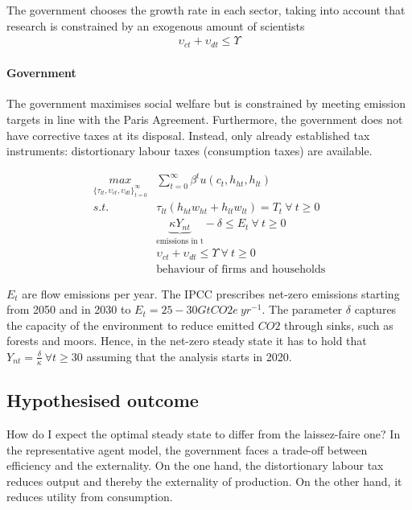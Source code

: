 The government chooses the growth rate in each sector, taking into account that research is constrained by an exogenous  amount of scientists
\begin{align}
\upsilon_{ct}+\upsilon_{dt}\leq\Upsilon
\end{align}
 
  
\paragraph{Government}

The government maximises social welfare but is constrained by meeting emission targets in line with the Paris Agreement. Furthermore, the government does not have corrective taxes at its disposal. Instead, only already established tax instruments: distortionary labour taxes (consumption taxes) are available. 

\begin{align}
\underset{\{\tau_{lt}, \upsilon_{ct}, \upsilon_{dt}\}_{t=0}^{\infty}}{max}&\sum_{t=0}^{\infty}\beta^t u(c_{t}, h_{ht}, h_{lt})\\
s.t.\ & \tau_{lt}(h_{ht}w_{ht}+h_{lt}w_{lt})=T_t\  \forall \ t\geq 0\\
& \underbrace{\kappa Y_{nt}}_{\text{emissions in t}} -\delta \leq E_t \  \forall \ t\geq 0\\
&\upsilon_{ct}+\upsilon_{dt}\leq\Upsilon\  \forall \ t\geq 0\\
& \text{behaviour of firms and households}
\end{align}

$E_t$ are flow emissions per year. The IPCC prescribes net-zero emissions starting from 2050 and in 2030 to $E_t= 25-30GtCO2e\ yr^{-1}$. The parameter $\delta$ captures the capacity of the environment to reduce emitted $CO2$ through sinks, such as forests and moors. Hence, in the net-zero steady state it has to hold that $Y_{nt}=\frac{\delta}{\kappa}\ \forall t\geq 30$ assuming that the analysis starts in 2020. 

\subsection{Hypothesised outcome}
How do I expect the optimal steady state to differ from the laissez-faire one? 
In the representative agent model, the government faces a trade-off  between efficiency and the externality. 
On the one hand, the distortionary labour tax reduces output and thereby the externality of production. On the other hand, it reduces utility from consumption.

